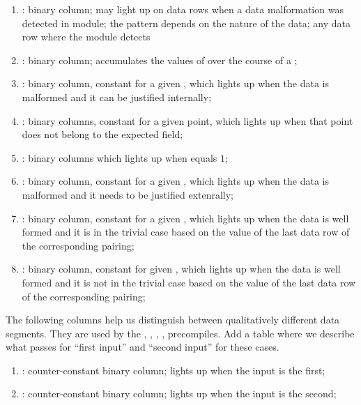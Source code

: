 \begin{enumerate}[resume]
    \item
        \both{\malformedDataInternalBit}:
        binary column;
        may light up on data rows when a data malformation was detected in module;
        the pattern depends on the nature of the data;
        any data row where the module detects
    \item
        \both{\malformedDataInternalAcc}:
        binary column;
        accumulates the values of \malformedDataInternalBit{} over the course of a \blsId{};
    \item
        \both{\malformedDataInternalTot}:
        binary column, constant for a given \blsId{},
        which lights up when the data is malformed and it can be justified internally;
    \item
        \both{\malformedDataExternalBit} \blsPrediction{}:
        binary columns, constant for a given point, which lights up when that point does not belong to the expected field; %
    \item
        \both{\malformedDataExternalAcc}:
        binary columns which lights up when \malformedDataExternalBit{} equals $1$;
    \item
        \both{\malformedDataExternalTot}:
        binary column, constant for a given \blsId, which lights up when the data is malformed and it needs to be justified extenrally;
    \item
        \both{\wellformedDataTrivial}:
        binary column, constant for a given \blsId, which lights up when the data is well formed and it is in the trivial case based on the value of the last data row of the corresponding pairing;
    \item
        \both{\wellformedDataNontrivial}:
        binary column, constant for  given \blsId, which lights up when the data is well formed and it is not in the trivial case based on the value of the last data row of the corresponding pairing;
\end{enumerate}
The following columns help us distinguish between qualitatively different data segments.
They are used by the
,
,
,
,
precompiles.
\specTodo{} Add a table where we describe what passes for ``first input'' and ``second input'' for these cases.
\begin{enumerate}[resume]
    \item
        \isFirstInput:
        counter-constant binary column;
        lights up when the input is the first;
    \item
        \isSecondInput:
        counter-constant binary column;
        lights up when the input is the second;
\end{enumerate}
